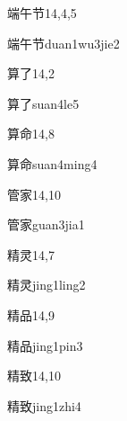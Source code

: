 \begin{entry}{端午节}{14,4,5}
  \begin{phonetics}{端午节}{duan1wu3jie2}
  \end{phonetics}
\end{entry}

\begin{entry}{算了}{14,2}
  \begin{phonetics}{算了}{suan4le5}
  \end{phonetics}
\end{entry}

\begin{entry}{算命}{14,8}
  \begin{phonetics}{算命}{suan4ming4}
  \end{phonetics}
\end{entry}

\begin{entry}{管家}{14,10}
  \begin{phonetics}{管家}{guan3jia1}
  \end{phonetics}
\end{entry}

\begin{entry}{精灵}{14,7}
  \begin{phonetics}{精灵}{jing1ling2}
  \end{phonetics}
\end{entry}

\begin{entry}{精品}{14,9}
  \begin{phonetics}{精品}{jing1pin3}
  \end{phonetics}
\end{entry}

\begin{entry}{精致}{14,10}
  \begin{phonetics}{精致}{jing1zhi4}
  \end{phonetics}
\end{entry}

